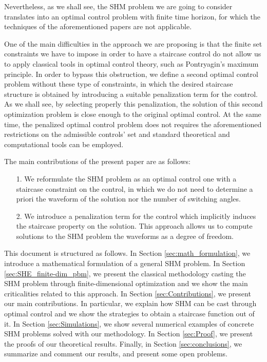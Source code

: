 \documentclass[twocolumn]{autart}    %
\begin{document}
Nevertheless, as we shall see, the SHM problem we are going to consider translates into an optimal control problem with finite time horizon, for which the techniques of the aforementioned papers are not applicable. 

One of the main difficulties in the approach we are proposing is that the finite set constraints we have to impose in order to have a staircase control do not allow us to apply classical tools in optimal control theory, such as Pontryagin's maximum principle. In order to bypass this obstruction, we define a second optimal control problem without these type of constraints, in which the desired staircase structure is obtained by introducing a suitable penalization term for the control. As we shall see, by selecting properly this penalization, the solution of this second optimization problem is close enough to the original optimal control. At the same time, the penalized optimal control problem does not requires the aforementioned restrictions on the admissible controls' set and standard theoretical and computational tools can be employed. 

The main contributions of the present paper are as follows:
\begin{enumerate}
    \item[1.] We reformulate the SHM problem as an optimal control one with a staircase constraint on the control, in which we do not need to determine a priori the waveform of the solution nor the number of switching angles.  
    \item[2.] We introduce a penalization term for the control which implicitly induces the staircase property on the solution. 
	This approach allows us to compute solutions to the SHM problem the waveforms as a degree of freedom.
\end{enumerate}

This document is structured as follows. In Section \ref{sec:math_formulation}, we introduce a mathematical formulation of a general SHM problem. 
In Section \ref{sec:SHE_finite-dim_pbm}, we present the classical methodology casting the SHM problem through finite-dimensional optimization and we show the main criticalities related to this approach. In Section \ref{sec:Contributions}, we present our main contributions. In particular, we explain how SHM can be cast through optimal control and we show the strategies to obtain a staircase function out of it. In Section \ref{sec:Simulations}, we show several numerical examples of concrete SHM problems solved with our methodology. In Section \ref{sec:Proof}, we present the proofs of our theoretical results. Finally, in Section \ref{sec:conclusions}, we summarize and comment our results, and present some open problems.
\end{document}
